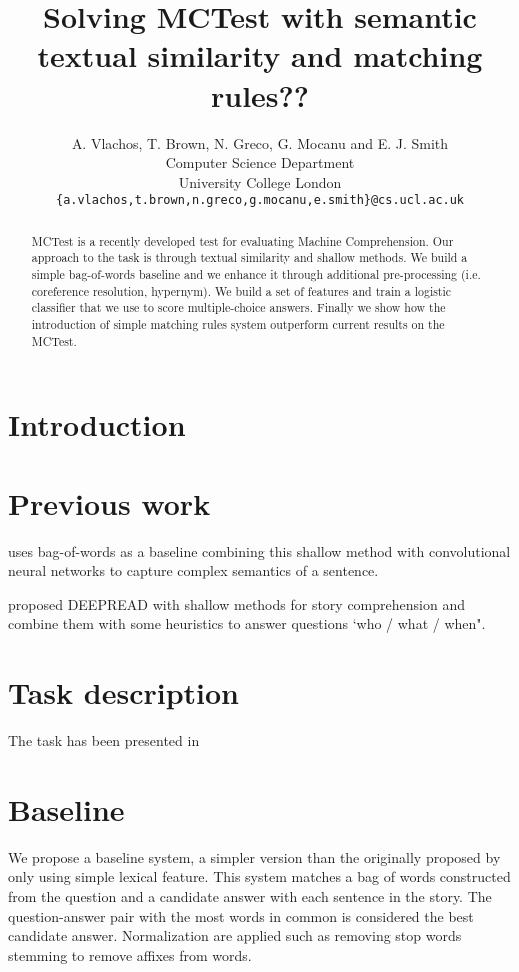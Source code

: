 \documentclass[11pt]{article}
\title{Solving MCTest with semantic textual similarity and matching rules??}
\author
       {A. Vlachos, T. Brown, N. Greco, G. Mocanu and E. J. Smith
       \\
       Computer Science Department\\
	University College London\\
       \tt{\{a.vlachos,t.brown,n.greco,g.mocanu,e.smith\}@cs.ucl.ac.uk}\\ 
       }
\date{}
\begin{document}
\maketitle
\begin{abstract}
MCTest is a recently developed test for evaluating Machine Comprehension.
Our approach to the task is through textual similarity and shallow methods.
We build a simple bag-of-words baseline and we enhance it through additional pre-processing (i.e. coreference resolution, hypernym).
We build a set of features and train a logistic classifier that we use to score multiple-choice answers.
Finally we show how the introduction of simple matching rules system outperform current results on the MCTest.
\end{abstract}

\section{Introduction}

\section{Previous work}

 uses bag-of-words as a baseline combining this shallow method with convolutional neural networks to capture complex semantics of a sentence.

 proposed D{\small EEP}R{\small EAD} with shallow methods for story comprehension and combine them with some heuristics to answer questions `who / what / when".

\section{Task description}

The task has been presented in  \cite{mctest}

\section{Baseline}
We propose a baseline system, a simpler version than the originally proposed by  only using simple lexical feature.
This system matches a bag of words constructed from the question and a candidate answer with each sentence in the story.
The question-answer pair with the most words in common is considered the best candidate answer.
Normalization are applied such as removing stop words stemming to remove affixes from words.
\end{document}
